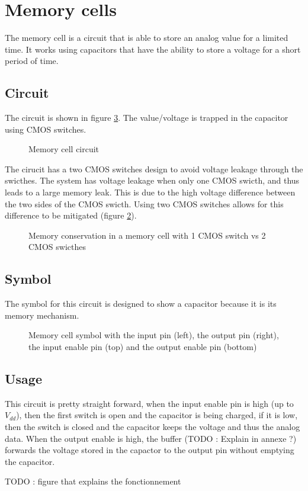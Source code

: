 \section{Memory cells}
\label{sec:memcell}

The memory cell is a circuit that is able to store an analog value for a limited time. It works using capacitors that have the ability to store a voltage for a short period of time.

\subsection{Circuit}

The circuit is shown in figure \ref{fig:memcellCircuit}. The value/voltage is trapped in the capacitor using CMOS switches.

\begin{figure}[H]
  \centering
  
  \caption{Memory cell circuit}
  \label{fig:memcellCircuit}
\end{figure}

The cirucit has a two CMOS switches design to avoid voltage leakage through the swicthes. The system has voltage leakage when only one CMOS swicth, and thus leads to a large memory leak. This is due to the high voltage difference between the two sides of the CMOS swicth. Using two CMOS switches allows for this difference to be mitigated (figure \ref{fig:memcellLoss}).

\begin{figure}[H]
  \centering
  
  \caption{Memory conservation in a memory cell with 1 CMOS switch vs 2 CMOS swicthes}
  \label{fig:memcellLoss}
\end{figure}

\subsection{Symbol}

The symbol for this circuit is designed to show a capacitor because it is its memory mechanism.

\begin{figure}[H]
  \centering
  
  \caption{Memory cell symbol with the input pin (left), the output pin (right), the input enable pin (top) and the output enable pin (bottom)}
  \label{fig:memcellCircuit}
\end{figure}

\subsection{Usage}

This circuit is pretty straight forward, when the input enable pin is high (up to $V_{dd}$), then the first switch is open and the capacitor is being charged, if it is low, then the switch is closed and the capacitor keeps the voltage and thus the analog data. When the output enable is high, the buffer (TODO : Explain in annexe ?) forwards the voltage stored in the capactor to the output pin without emptying the capacitor.

TODO : figure that explains the fonctionnement
